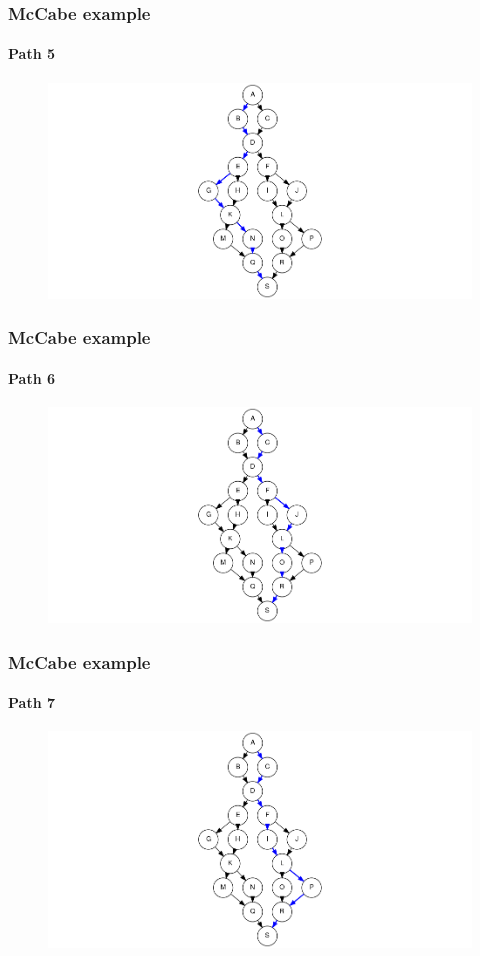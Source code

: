 \begin{frame}[c]
\frametitle{McCabe example}
\framesubtitle{Path 5}

\begin{figure}
	\centering
	\includegraphics[scale=.3]{aux/examples/mccabe/mccabe-example-path-5}
\end{figure}
\end{frame}


\begin{frame}[c]
\frametitle{McCabe example}
\framesubtitle{Path 6}

\begin{figure}
	\centering
	\includegraphics[scale=.3]{aux/examples/mccabe/mccabe-example-path-6}
\end{figure}
\end{frame}


\begin{frame}[c, hasprev=true, hasnext=false]
\frametitle{McCabe example}
\framesubtitle{Path 7}

\begin{figure}
	\centering
	\includegraphics[scale=.3]{aux/examples/mccabe/mccabe-example-path-7}
\end{figure}
\end{frame}